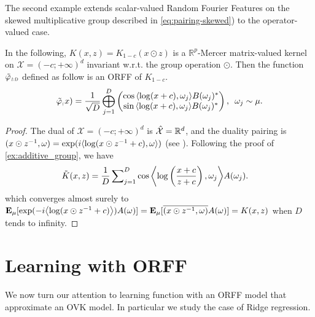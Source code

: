 The second example extends scalar-valued Random Fourier Features on the skewed multiplicative group described in \cref{eq:pairing-skewed}) to the operator-valued case.
\begin{example}
In the following, $K(x,z)=K_{1-c}(x\odot z)$ is a $\mathbb{R}^p$-Mercer matrix-valued kernel on $\mathcal{X}=(-c;+\infty)^d$ invariant w.r.t. the group operation $\odot$. Then the function $\tildePhi{1:D}$ defined as follow is an \acl{ORFF} of $K_{1-c}$.
\begin{equation*}
\begin{aligned}
\tildePhi(x)=\frac{1}{\sqrt{D}}\Vect_{j=1}^D\begin{pmatrix}\cos{\inner{\log(x+c),\omega_j}}B(\omega_j)^* \\ \sin{\inner{\log(x+c),\omega_j}}B(\omega_j)^*\end{pmatrix}, \enskip \omega_j \sim \mu.
\end{aligned}
\end{equation*}
\end{example}
\begin{proof}
The dual of $\mathcal{X}=(-c;+\infty)^d$
is $\dual{\mathcal{X}}=\mathbb{R}^d$, and the duality pairing is $\pairing{x \odot \myinv{z},\omega}=\exp(i\inner{\log(x\odot z^{-1}+c), \omega})$ (see \citet{Li2010}). Following the proof of \cref{ex:additive_group}, we have
\begin{equation*}
\begin{aligned}
\tilde{K}(x,z)&= \frac{1}{D} \sum\nolimits_{j=1}^D \cos{\inner*{\log\left(\frac{x+c}{z+c}\right), \omega_j}}A(\omega_j).
\end{aligned}
\end{equation*}
which converges almost surely to $\expectation_{\mu}[\exp(-i\inner*{\log(x\odot z^{-1}+c)})A(\omega) ]=\expectation_{\mu}[\conj{\pairing{x\odot z^{-1},\omega}}A(\omega)]=K(x, z)$ when $D$ tends to infinity.
\end{proof}

\clearpage
\section{Learning with ORFF}
\label{sec:learning_with_operator-valued_random-fourier_features}
We now turn our attention to learning function with an ORFF model that approximate an OVK model. In particular we study the case of Ridge regression.
